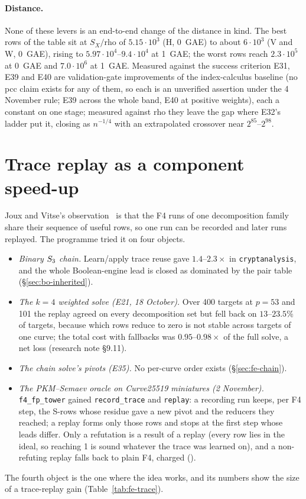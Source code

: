 \paragraph{Distance.} None of these levers is an end-to-end change of the
distance in kind. The best rows of the table sit at $S_X/\text{rho}$ of
$5.15\cdot10^3$ (H, 0~GAE) to about $6\cdot10^3$ (V and W, 0~GAE), rising to
$5.97\cdot10^4$--$9.4\cdot10^4$ at 1~GAE; the worst rows reach
$2.3\cdot10^5$ at 0~GAE and $7.0\cdot10^6$ at 1~GAE. Measured against the success criterion E31,
E39 and E40 are validation-gate improvements of the index-calculus baseline
(no pcc claim exists for any of them, so each is an unverified assertion
under the 4 November rule; E39
across the whole band, E40 at positive weights), each a constant on one
stage; measured against rho they leave the gap where E32's ladder put it,
closing as $n^{-1/4}$ with an extrapolated crossover near $2^{85}$--$2^{98}$.

\section{Trace replay as a component speed-up}\label{sec:fe-trace}

Joux and Vitse's observation~\cite{jouxvitse2011f4} is that the F4 runs of one
decomposition family share their sequence of useful rows, so one run can be
recorded and later runs replayed. The programme tried it on four objects.
\begin{itemize}
\item \emph{Binary $S_{3}$ chain.} Learn/apply trace reuse gave
  $1.4$--$2.3\times$ in \texttt{cryptanalysis}, and the whole Boolean-engine
  lead is closed as dominated by the pair table
  (\S\ref{sec:bo-inherited}).
\item \emph{The $k=4$ weighted solve (E21, 18 October).} Over 400 targets at
  $p=53$ and 101 the replay agreed on every decomposition set but fell back
  on $13$--$23.5\%$ of targets, because which rows reduce to zero is not
  stable across targets of one curve; the total cost with fallbacks was
  $0.95$--$0.98\times$ of the full solve, a net loss (research note \S9.11).
\item \emph{The chain solve's pivots (E35).} No per-curve order exists
  (\S\ref{sec:fe-chain}).
\item \emph{The PKM--Semaev oracle on Curve25519 miniatures (2 November).}
  \texttt{f4\_fp\_tower} gained \texttt{record\_trace} and \texttt{replay}: a
  recording run keeps, per F4 step, the S-rows whose residue gave a new
  pivot and the reducers they reached; a replay forms only those rows and
  stops at the first step whose leads differ. Only a refutation is a result
  of a replay (every row lies in the ideal, so reaching 1 is sound whatever
  the trace was learned on), and a non-refuting replay falls back to plain
  F4, charged ().
\end{itemize}
The fourth object is the one where the idea works, and its numbers show the
size of a trace-replay gain (Table~\ref{tab:fe-trace}).

